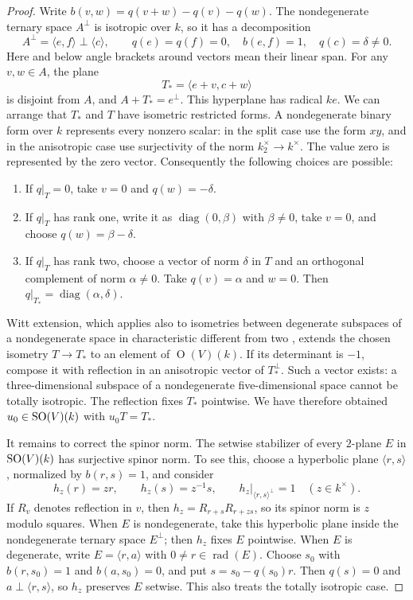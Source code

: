 \begin{proof}
Write $b(v,w)=q(v+w)-q(v)-q(w)$.  The nondegenerate ternary space
$A^\perp$ is isotropic over $k$, so it has a decomposition
\[
 A^\perp=\langle e,f\rangle\perp\langle c\rangle,
 \qquad q(e)=q(f)=0,\quad b(e,f)=1,\quad q(c)=\delta\ne0.
\]
Here and below angle brackets around vectors mean their linear span.  For
any $v,w\in A$, the plane
\[
 T_* = \langle e+v,c+w\rangle
\]
is disjoint from $A$, and $A+T_*=e^\perp$.  This hyperplane has radical $ke$.
We can arrange that $T_*$ and $T$ have isometric restricted forms.  A
nondegenerate binary form over $k$ represents every nonzero scalar: in the
split case use the form $xy$, and in the anisotropic case use surjectivity
of the norm $k_2^\times\to k^\times$.  The value zero is represented by the
zero vector.  Consequently the following choices are possible:
\begin{enumerate}[label=(\roman*),leftmargin=*]
\item If $q|_T=0$, take $v=0$ and $q(w)=-\delta$.
\item If $q|_T$ has rank one, write it as $\operatorname{diag}(0,\beta)$
with $\beta\ne0$, take $v=0$, and choose $q(w)=\beta-\delta$.
\item If $q|_T$ has rank two, choose a vector of norm $\delta$ in $T$ and
an orthogonal complement of norm $\alpha\ne0$.  Take $q(v)=\alpha$ and
$w=0$.  Then $q|_{T_*}=\operatorname{diag}(\alpha,\delta)$.
\end{enumerate}
Witt extension, which applies also to isometries between degenerate
subspaces of a nondegenerate space in characteristic different from two
\cite[Theorem~8.3]{EKM2008}, extends the chosen isometry $T\to T_*$ to an element of $\operatorname{O}(V)(k)$.
If its determinant is $-1$, compose it with reflection in an anisotropic
vector of $T_*^\perp$.  Such a vector exists: a three-dimensional subspace
of a nondegenerate five-dimensional space cannot be totally isotropic.
The reflection fixes $T_*$ pointwise.  We have therefore obtained
$u_0\in\operatorname{SO}(V)(k)$ with $u_0T=T_*$.

It remains to correct the spinor norm.  The setwise stabilizer of every
$2$-plane $E$ in $\operatorname{SO}(V)(k)$ has surjective spinor norm.  To see this,
choose a hyperbolic plane $\langle r,s\rangle$, normalized by $b(r,s)=1$,
and consider
\[
 h_z(r)=zr,\qquad h_z(s)=z^{-1}s,\qquad
 h_z|_{\langle r,s\rangle^\perp}=1\quad(z\in k^\times).
\]
If $R_v$ denotes reflection in $v$, then
$h_z=R_{r+s}R_{r+zs}$, so its spinor norm is $z$ modulo squares.
When $E$ is nondegenerate, take this hyperbolic plane inside the
nondegenerate ternary space $E^\perp$; then $h_z$ fixes $E$ pointwise.
When $E$ is degenerate, write $E=\langle r,a\rangle$ with
$0\ne r\in\operatorname{rad}(E)$.  Choose $s_0$ with
$b(r,s_0)=1$ and $b(a,s_0)=0$, and put $s=s_0-q(s_0)r$.
Then $q(s)=0$ and $a\perp\langle r,s\rangle$, so $h_z$ preserves
$E$ setwise.  This also treats the totally isotropic case.


\end{proof}
